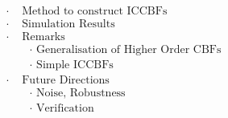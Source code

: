 \documentclass[preview]{standalone}
\begin{document}
\begin{align*}
\boldsymbol{\cdot} & \text{ Method to construct ICCBFs}\\ \boldsymbol{\cdot} &\text{ Simulation Results}\\ \boldsymbol{\cdot} &\text{ Remarks}\\ &\quad \boldsymbol{\cdot} \text{ Generalisation of Higher Order CBFs}\\ &\quad \boldsymbol{\cdot} \text{ Simple ICCBFs}\\ \boldsymbol{\cdot} & \text{ Future Directions}\\ &\quad \boldsymbol{\cdot} \text{ Noise, Robustness}\\ &\quad \boldsymbol{\cdot} \text{ Verification}\\
\end{align*}
\end{document}
